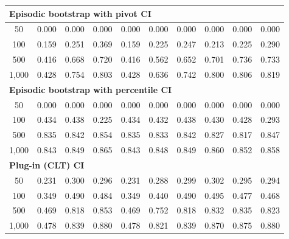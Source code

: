 \documentclass{article}
\numberwithin{equation}{section}
\begin{document}
\begin{table}[ht]
\begin{tabular}{c|ccc|cccccc}
\hline
\multicolumn{10}{l}{\textbf{Episodic bootstrap with pivot CI}} \\ \hline
50
& 0.000 & 0.000 & 0.000
& 0.000 & 0.000 & 0.000 & 0.000 & 0.000 & 0.000 \\
100
& 0.159 & 0.251 & 0.369
& 0.159 & 0.225 & 0.247 & 0.213 & 0.225 & 0.290 \\
500
& 0.416 & 0.668 & \cellcolor{covheat!10!white}0.720
& 0.416 & 0.562 & 0.652 & \cellcolor{covheat!1!white}0.701 & \cellcolor{covheat!18!white}0.736 & \cellcolor{covheat!17!white}0.733 \\
1{,}000
& 0.428 & \cellcolor{covheat!27!white}0.754 & \cellcolor{covheat!52!white}0.803
& 0.428 & 0.636 & \cellcolor{covheat!21!white}0.742 & \cellcolor{covheat!50!white}0.800 & \cellcolor{covheat!53!white}0.806 & \cellcolor{covheat!59!white}0.819 \\
\hline
\multicolumn{10}{l}{\textbf{Episodic bootstrap with percentile CI}} \\ \hline
50
& 0.000 & 0.000 & 0.000
& 0.000 & 0.000 & 0.000 & 0.000 & 0.000 & 0.000 \\
100
& 0.434 & 0.438 & 0.225
& 0.434 & 0.432 & 0.438 & 0.430 & 0.428 & 0.293 \\
500
& \cellcolor{covheat!67!white}0.835 & \cellcolor{covheat!71!white}0.842 & \cellcolor{covheat!77!white}0.854
& \cellcolor{covheat!67!white}0.835 & \cellcolor{covheat!66!white}0.833 & \cellcolor{covheat!71!white}0.842 & \cellcolor{covheat!63!white}0.827 & \cellcolor{covheat!58!white}0.817 & \cellcolor{covheat!73!white}0.847 \\
1{,}000
& \cellcolor{covheat!71!white}0.843 & \cellcolor{covheat!74!white}0.849 & \cellcolor{covheat!82!white}0.865
& \cellcolor{covheat!71!white}0.843 & \cellcolor{covheat!74!white}0.848 & \cellcolor{covheat!74!white}0.849 & \cellcolor{covheat!80!white}0.860 & \cellcolor{covheat!76!white}0.852 & \cellcolor{covheat!79!white}0.858 \\
\hline
\multicolumn{10}{l}{\textbf{Plug-in (CLT) CI}} \\ \hline
50
& 0.231 & 0.300 & 0.296
& 0.231 & 0.288 & 0.299 & 0.302 & 0.295 & 0.294 \\
100
& 0.349 & 0.490 & 0.484
& 0.349 & 0.440 & 0.490 & 0.495 & 0.477 & 0.468 \\
500
& 0.469 & \cellcolor{covheat!59!white}0.818 & \cellcolor{covheat!76!white}0.853
& 0.469 & \cellcolor{covheat!26!white}0.752 & \cellcolor{covheat!59!white}0.818 & \cellcolor{covheat!66!white}0.832 & \cellcolor{covheat!67!white}0.835 & \cellcolor{covheat!61!white}0.823 \\
1{,}000
& 0.478 & \cellcolor{covheat!69!white}0.839 & \cellcolor{covheat!90!white}0.880
& 0.478 & \cellcolor{covheat!60!white}0.821 & \cellcolor{covheat!69!white}0.839 & \cellcolor{covheat!85!white}0.870 & \cellcolor{covheat!87!white}0.875 & \cellcolor{covheat!90!white}0.880 \\
\hline
\end{tabular}
\end{table}
\end{document}
